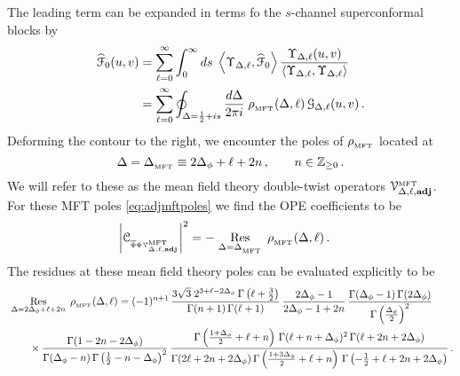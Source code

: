 \documentclass[11pt]{article}
\newcommand{\Phib}{\overline{\Phi}}
\newcommand{\cope}[1]{\mathcal{C}_{_{#1}}}
\newcommand{\mft}{\text{\tiny MFT}}
\begin{document}
The leading term can be expanded in terms fo the $s$-channel superconformal blocks by
%
\begin{equation}
\begin{split}
 \widehat{\mathcal{F}}_0(u,v)&=\sum_{\ell = 0}^{\infty}\int_{0}^{\infty}ds \; 
	\expval{\Upsilon_{\Delta,\ell},\widehat{\mathcal{F}}_{0}}\frac{\Upsilon_{\Delta,\ell}(u,v)}{\expval{ \Upsilon_{\Delta,\ell},\Upsilon_{\Delta,\ell}}} 
\\
&= \sum_{\ell = 0}^{\infty}\oint_{\Delta=\frac{1}{2}+is}\frac{d\Delta}{2\pi i} \; \rho_{_\mft}(\Delta,\ell)\, \mathcal{G}_{\Delta,\ell}(u,v)\,.
\end{split}
\end{equation}
%
Deforming the contour to the right, we encounter the poles of $\rho_{_\mft}$ located at 
%
\begin{equation}\label{eq:adjmftpoles}
\Delta = \Delta_{_\mft} \equiv 2\Delta_\phi + \ell + 2 n \,, \qquad n \in \mathbb{Z}_{\geq 0} \,.
\end{equation}  
%
We will refer to these as the mean field theory double-twist operators $\mathcal{V}^\mft_{\Delta,\ell,{\bf adj}}$. 
For these MFT poles \eqref{eq:adjmftpoles} we find the OPE coefficients to be
%
\begin{equation}\label{eqn:OPEcoeffsMFT}
\begin{split}
\abs{\cope{\Phib\Phi\mathcal{V}^{\text{\tiny MFT}}_{\Delta,\ell,{\bf adj}}}}^2
  &= 
    -\underset{\Delta=\Delta_{_\mft}}{\Res}\,\rho_{ _\mft }(\Delta,\ell) \,.
\end{split}
\end{equation}
%
The residues at these mean field theory poles  can be evaluated explicitly to be 
%
\begin{equation}\label{eq:MFTresidue}
\begin{split}
&\underset{\Delta=2\Delta_\phi+\ell+2n}{\Res}\,\rho_{ _\mft }(\Delta,\ell) 
 = 
 (-1)^{n+1}\, \frac{3\sqrt{3}\; 2^{3+\ell-2\Delta_\phi}\, \Gamma\left(\ell+\frac{3}{2}\right)}{\Gamma(n+1)\, \Gamma(\ell+1)} \, \frac{2\Delta_\phi-1}{2\Delta_\phi-1+2n}\,  \frac{\Gamma(\Delta_\phi-1)\, \Gamma(2\Delta_\phi)}{\Gamma\left(\frac{\Delta_\phi}{2}\right)^2}  \\
&\qquad
\times \frac{\Gamma(1-2n-2\Delta_\phi)}{\Gamma(\Delta_\phi-n)\, \Gamma\left(\frac{1}{2}-n-\Delta_\phi\right)^2} \, \frac{\Gamma\left(\frac{1+\Delta_\phi}{2} + \ell +n\right) \, \Gamma(\ell+n+\Delta_\phi)^2 \, \Gamma(\ell+2n+2\Delta_\phi)}{\Gamma(2\ell +2n +2 \Delta_\phi)\, \Gamma\left(\frac{1+3\Delta_\phi}{2}+\ell+n\right)\, \Gamma\left(-\frac{1}{2}+ \ell+2n + 2 \Delta_\phi\right)} \,.
\end{split}
\end{equation}
\end{document}

